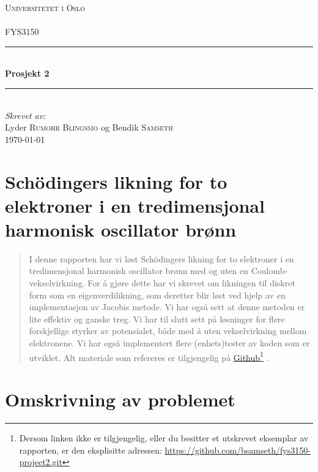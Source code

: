 \documentclass[11pt]{article}
\begin{document}
\begin{titlepage}
  \newcommand{\HRule}{\rule{\linewidth}{0.5mm}}
  \center
  \textsc{\LARGE Universitetet i Oslo}\\[1.5cm] %
  \textsc{\Large }\\[0.5cm] %
  \textsc{\large FYS3150}\\[0.5cm] %
  \HRule \\[0.4cm]
  { \huge \bfseries Prosjekt 2 }\\[0.4cm] %
  \HRule \\[1.5cm]
  \Large \emph{Skrevet av:}\\
  Lyder \textsc{Rumohr Blingsmo} og Bendik \textsc{Samseth}\\[3cm]
  {\large \today}\\[3cm]
  \vfill
\end{titlepage}


\section*{Schödingers likning for to elektroner i en tredimensjonal
  harmonisk oscillator brønn}
\begin{abstract}
  I denne rapporten har vi løst Schödingers likning for to elektroner
  i en tredimensjonal harmonisk oscillator brønn med og uten en
  Coulomb-vekselvirkning. For å gjøre dette har vi skrevet om
  likningen til diskret form som en eigenverdilikning, som deretter blir
  løst ved hjelp av en implementasjon av Jacobis metode. Vi har også
  sett at denne metoden er lite effektiv og ganske treg. Vi har til
  slutt sett på løsninger for flere forskjellige styrker av
  potensialet, både med å uten vekselvirkning mellom elektronene. Vi
  har også implementert flere (enhets)tester av koden som er
  utviklet. Alt materiale som refereres er tilgjengelig på
  \href{https://github.com/bsamseth/fys3150-project2.git}{Github}\footnote{Dersom
    linken ikke er tilgjengelig, eller du besitter et utskrevet
    eksemplar av rapporten, er den eksplisitte 
    adressen: \url{https://github.com/bsamseth/fys3150-project2.git}} .
\end{abstract}

\section{Omskrivning av problemet}
\end{document}
